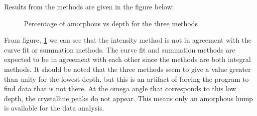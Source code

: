     Results from the methods are given in the figure below:

    \begin{figure}[H]
        \centering
        
        \caption{Percentage of amorphous vs depth for the three methods}
        \label{fig:line graph amorphous with depth}
    \end{figure}


    From figure, \ref{fig:line graph amorphous with depth} we can see that the intensity method is not in agreement with the curve fit or summation methods.
    The curve fit and summation methods are expected to be in agreement with each other since the methods are both integral methods. 
    It should be noted that the three methods seem to give a value greater than unity for the lowest depth, but this is an artifact of forcing the program to find data that is not there. 
    At the omega angle that corresponds to this low depth, the crystalline peaks do not appear. 
    This means only an amorphous hump is available for the data analysis. 
    